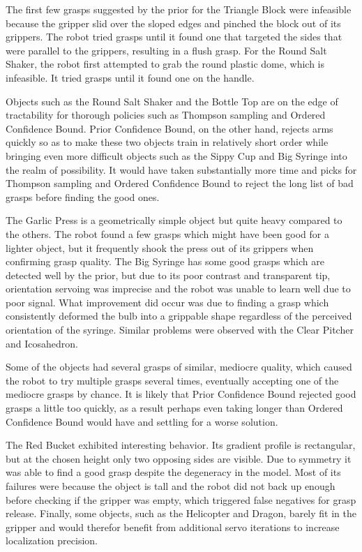 \documentclass{article}
\newcommand{\algorithmCTxt}{Ordered Confidence Bound\xspace}
\newcommand{\algorithmDTxt}{Prior Confidence Bound\xspace}
\begin{document}
The first few grasps suggested by the prior for the Triangle Block were infeasible because
the gripper slid over the sloped edges and pinched the block out of its grippers. The robot
tried grasps until it found one that targeted the sides that were parallel to the grippers,
resulting in a flush grasp. 
For the Round Salt Shaker, the robot first attempted to grab the round plastic dome, which 
is infeasible. It tried grasps until it found one on the handle.

Objects such as the Round Salt Shaker and the Bottle Top are on the edge of tractability
for thorough policies such as Thompson sampling and \algorithmCTxt. \algorithmDTxt, on the other
hand, rejects arms quickly so as to make these two objects train in relatively short order
while bringing even more difficult objects such as the Sippy Cup and Big Syringe into the
realm of possibility. It would have taken substantially more time and picks for Thompson
sampling and \algorithmCTxt to reject the long list of bad grasps before finding the good ones.

The Garlic Press is a geometrically simple object but quite heavy compared to the others. The
robot found a few grasps which might have been good for a lighter object, but it frequently
shook the press out of its grippers when confirming grasp quality.
The Big Syringe has some good grasps which are detected well by the prior, but due to its poor
contrast and transparent tip, orientation servoing was imprecise and the robot was unable to
learn well due to poor signal. What improvement did occur was due to finding a grasp which
consistently deformed the bulb into a grippable shape regardless of the perceived orientation
of the syringe. Similar problems were observed with the Clear Pitcher and Icosahedron.

Some of the objects had several grasps of similar, mediocre quality, which
caused the robot to try multiple grasps several times, eventually accepting one of the
mediocre grasps by chance. It is likely that \algorithmDTxt rejected good grasps a little
too quickly, as a result perhaps even taking longer than \algorithmCTxt would have and settling
for a worse solution.

The Red Bucket exhibited interesting behavior. Its gradient profile is rectangular, but at the
chosen height only two opposing sides are visible. Due to symmetry it was able to find a good
grasp despite the degeneracy in the model. Most of its failures were because the object is tall
and the robot did not back up enough before checking if the gripper was empty, which triggered
false negatives for grasp release.
Finally, some objects, such as the Helicopter and Dragon, barely fit in the gripper and would
therefor benefit from additional servo iterations to increase localization precision. 
\end{document}
